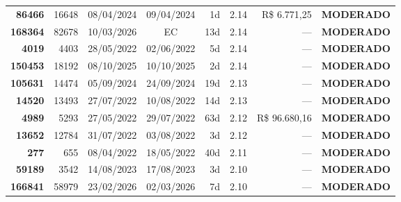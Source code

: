 \documentclass[a4paper,10pt]{article}
\begin{document}
\begin{center}
\begin{longtable}{>{\scriptsize}r>{\scriptsize}r>{\scriptsize}c>{\scriptsize}c>{\scriptsize}r>{\scriptsize}r>{\scriptsize}r>{\scriptsize}l}
\textcolor{anomyellow}{\textbf{86466}} & 16648 & 08/04/2024 & 09/04/2024 & 1d & \textcolor{anomyellow}{2.14} & R\$ 6.771,25 & \textcolor{anomyellow}{\textbf{MODERADO}} \\

\textcolor{anomyellow}{\textbf{168364}} & 82678 & 10/03/2026 & \textcolor{anomorange}{EC} & 13d & \textcolor{anomyellow}{2.14} & --- & \textcolor{anomyellow}{\textbf{MODERADO}} \\

\textcolor{anomyellow}{\textbf{4019}} & 4403 & 28/05/2022 & 02/06/2022 & 5d & \textcolor{anomyellow}{2.14} & --- & \textcolor{anomyellow}{\textbf{MODERADO}} \\

\textcolor{anomyellow}{\textbf{150453}} & 18192 & 08/10/2025 & 10/10/2025 & 2d & \textcolor{anomyellow}{2.14} & --- & \textcolor{anomyellow}{\textbf{MODERADO}} \\

\textcolor{anomyellow}{\textbf{105631}} & 14474 & 05/09/2024 & 24/09/2024 & 19d & \textcolor{anomyellow}{2.13} & --- & \textcolor{anomyellow}{\textbf{MODERADO}} \\

\textcolor{anomyellow}{\textbf{14520}} & 13493 & 27/07/2022 & 10/08/2022 & 14d & \textcolor{anomyellow}{2.13} & --- & \textcolor{anomyellow}{\textbf{MODERADO}} \\

\textcolor{anomyellow}{\textbf{4989}} & 5293 & 27/05/2022 & 29/07/2022 & 63d & \textcolor{anomyellow}{2.12} & R\$ 96.680,16 & \textcolor{anomyellow}{\textbf{MODERADO}} \\

\textcolor{anomyellow}{\textbf{13652}} & 12784 & 31/07/2022 & 03/08/2022 & 3d & \textcolor{anomyellow}{2.12} & --- & \textcolor{anomyellow}{\textbf{MODERADO}} \\

\textcolor{anomyellow}{\textbf{277}} & 655 & 08/04/2022 & 18/05/2022 & 40d & \textcolor{anomyellow}{2.11} & --- & \textcolor{anomyellow}{\textbf{MODERADO}} \\

\textcolor{anomyellow}{\textbf{59189}} & 3542 & 14/08/2023 & 17/08/2023 & 3d & \textcolor{anomyellow}{2.10} & --- & \textcolor{anomyellow}{\textbf{MODERADO}} \\

\textcolor{anomyellow}{\textbf{166841}} & 58979 & 23/02/2026 & 02/03/2026 & 7d & \textcolor{anomyellow}{2.10} & --- & \textcolor{anomyellow}{\textbf{MODERADO}} \\


\end{longtable}
\end{center}
\end{document}
